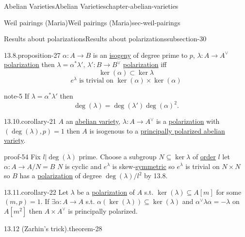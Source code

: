 \documentclass[oneside,10pt,]{book}
\numberwithin{equation}{section}
\newcommand{\lb}{[}
\newcommand{\rb}{]}
\begin{document}
\begin{chapterptx}{Abelian Varieties}{}{Abelian Varieties}{}{}{chapter-abelian-varieties}
\begin{sectionptx}{Weil pairings (Maria)}{}{Weil pairings (Maria)}{}{}{sec-weil-pairings}
\begin{subsectionptx}{Results about polarizations}{}{Results about polarizations}{}{}{subsection-30}
\begin{proposition}{13.8.}{}{proposition-27}
\hypertarget{p-322}{}%
\(\alpha\colon A \to B\) is an \hyperref[def-supersing-isog-isog]{isogeny} of degree prime to \(p\), \(\lambda\colon A\to A^\vee\) \hyperref[def-c-pol]{polarization} then \(\lambda = \alpha^* \lambda', \,\lambda' \colon B\to B^\vee\) \hyperref[def-c-pol]{polarization} iff%
\begin{equation*}
\ker(\alpha) \subset \ker \lambda
\end{equation*}
%
\begin{equation*}
e^{\lambda} \text{ is trivial on } \ker (\alpha)\times \ker(\alpha)
\end{equation*}
%
\end{proposition}
\begin{note}{}{note-5}%
\hypertarget{p-323}{}%
If \(\lambda = \alpha^* \lambda'\) then%
\begin{equation*}
\deg(\lambda) = \deg (\lambda') \deg(\alpha)^2\text{.}
\end{equation*}
%
\end{note}
\begin{corollary}{13.10.}{}{corollary-21}%
\hypertarget{p-324}{}%
\(A\) an \hyperref[def-buntes-abvar]{abelian variety}, \(\lambda \colon A \to A^\vee\) is a \hyperref[def-c-pol]{polarization} with \((\deg (\lambda), p) = 1\) then \(A\) is  isogenous to a \hyperref[def-princ-pol-av]{principally polarized abelian variety}.%
\end{corollary}
\begin{proofptx}{}{proof-54}
\hypertarget{p-325}{}%
Fix \(l |\deg(\lambda)\) prime. Choose a subgroup \(N\subseteq \ker \lambda\) of \hyperref[def-order-quaternion]{order} \(l\) let \(\alpha \colon A\to A/N = B\) \(N\) is cyclic and \(e^\lambda\) is skew-\hyperref[def-princ-pol]{symmetric} so \(e^{\lambda}\) is trivial on \(N\times N\) so \(B\) has a \hyperref[def-c-pol]{polarization} of degree \(\deg(\lambda) / l^2\) by 13.8.%
\end{proofptx}
\begin{corollary}{13.11.}{}{corollary-22}%
\hypertarget{p-326}{}%
Let \(\lambda\) be a \hyperref[def-c-pol]{polarization} of \(A\) s.t. \(\ker (\lambda) \subseteq A\lb m \rb\) for some \((m,p)=1\). If \(\exists \alpha \colon A \to A\) s.t. \(\alpha(\ker (\lambda)) \subseteq \ker(\lambda)\) and \(\alpha^\vee \lambda \alpha = - \lambda\) on \(A\lb m^2\rb\) then \(A\times A^\vee\) is principally polarized.%
\end{corollary}
\begin{theorem}{13.12 (Zarhin's trick).}{}{theorem-28}%
\hypertarget{p-327}{}%

\end{theorem}
\end{subsectionptx}
\end{sectionptx}
\end{chapterptx}
\end{document}
